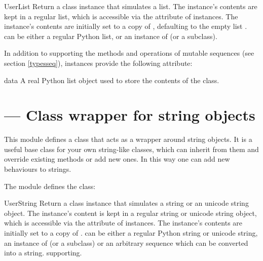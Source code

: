 \begin{classdesc}{UserList}{}
Return a class instance that simulates a list.  The instance's
contents are kept in a regular list, which is accessible via the
 attribute of  instances.  The instance's
contents are initially set to a copy of , defaulting to the
empty list \code{[]}.   can be either a regular Python list,
or an instance of  (or a subclass).
\end{classdesc}

In addition to supporting the methods and operations of mutable
sequences (see section \ref{typesseq}),  instances
provide the following attribute:

\begin{memberdesc}{data}
A real Python list object used to store the contents of the
 class.
\end{memberdesc}


\section{ ---
         Class wrapper for string objects}


This module defines a class that acts as a wrapper around
string objects.  It is a useful base class for
your own string-like classes, which can inherit from
them and override existing methods or add new ones.  In this way one
can add new behaviours to strings.

The  module defines the  class:

\begin{classdesc}{UserString}{}
Return a class instance that simulates a string or an unicode string object.
The instance's content is kept in a regular string or unicode string
object, which is accessible via the
 attribute of  instances.  The instance's
contents are initially set to a copy of .
 can be either a regular Python string or unicode string,
an instance of  (or a subclass) or an arbitrary sequence
which can be converted into a string.
supporting.
\end{classdesc}

